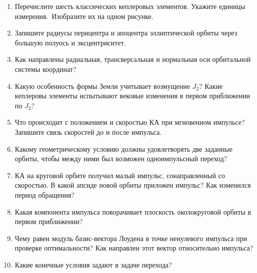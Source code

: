 \documentclass[11pt,a4paper]{article}
\begin{document}



\begin{enumerate}
\item {\raggedright Перечислите шесть классических кеплеровых элементов.
Укажите единицы \mbox{измерения. Изобразите} их на одном рисунке.\par}

\item Запишите радиусы перицентра и апоцентра эллиптической орбиты через
большую полуось и эксцентриситет.

\item Как направлены радиальная, трансверсальная и нормальная оси
орбитальной системы координат?

\item Какую особенность формы Земли учитывает возмущение $J_2$? Какие кеплеровы
элементы испытывают вековые изменения в первом приближении по $J_2$?

\item Что происходит с положением и скоростью КА при мгновенном импульсе?
Запишите связь скоростей до и после импульса.

\item Какому геометрическому условию должны удовлетворять две заданные орбиты,
чтобы между ними был возможен одноимпульсный переход?

\item КА на круговой орбите получил малый импульс, сонаправленный со скоростью.
В какой апсиде новой орбиты приложен импульс? Как изменился период обращения?

\item Какая компонента импульса поворачивает плоскость околокруговой орбиты
в первом приближении?

\item Чему равен модуль базис-вектора Лоудена в точке ненулевого импульса
при проверке оптимальности? Как направлен этот вектор относительно импульса?

\item Какие конечные условия задают в задаче перехода?


\end{enumerate}
\end{document}
